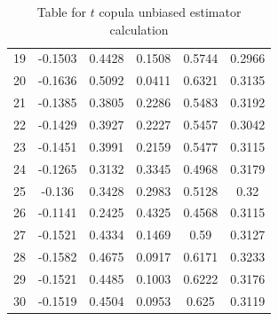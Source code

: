 \documentclass[11pt]{llncs}
\begin{document}
\begin{table}[h]
\begin{tabular}{c|ccccc}
    19  & -0.1503 & 0.4428 & 0.1508 & 0.5744 & 0.2966 \\
    20  & -0.1636 & 0.5092 & 0.0411 & 0.6321 & 0.3135 \\
    21  & -0.1385 & 0.3805 & 0.2286 & 0.5483 & 0.3192 \\
    22  & -0.1429 & 0.3927 & 0.2227 & 0.5457 & 0.3042 \\
    23  & -0.1451 & 0.3991 & 0.2159 & 0.5477 & 0.3115 \\
    24  & -0.1265 & 0.3132 & 0.3345 & 0.4968 & 0.3179 \\
    25  & -0.136  & 0.3428 & 0.2983 & 0.5128 & 0.32   \\
    26  & -0.1141 & 0.2425 & 0.4325 & 0.4568 & 0.3115 \\
    27  & -0.1521 & 0.4334 & 0.1469 & 0.59   & 0.3127 \\
    28  & -0.1582 & 0.4675 & 0.0917 & 0.6171 & 0.3233 \\
    29  & -0.1521 & 0.4485 & 0.1003 & 0.6222 & 0.3176 \\
    30  & -0.1519 & 0.4504 & 0.0953 & 0.625  & 0.3119 \\\hline
    \end{tabular}
    \caption{Table for $t$ copula unbiased estimator calculation}
\end{table}
\end{document}
